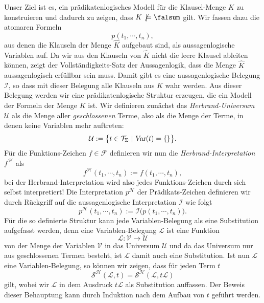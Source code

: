 Unser Ziel ist es, ein prädikatenlogisches Modell für die Klausel-Menge $K$ zu konstruieren und
dadurch zu zeigen, dass $K \not\,\models \falsum$ gilt.
Wir fassen dazu die atomaren Formeln
\[ p(t_1,\cdots,t_n), \]
aus denen die Klauseln der Menge $\widehat{K}$ aufgebaut sind, als aussagenlogische Variablen auf.
Da wir aus den Klauseln von $\widehat{K}$ nicht die leere Klausel ableiten können, zeigt der
Vollständigkeits-Satz der Aussagenlogik, dass die Menge $\widehat{K}$ aussagenlogisch erfüllbar 
sein muss.  Damit gibt es eine aussagenlogische Belegung $\mathcal{I}$, so dass mit dieser Belegung
alle Klauseln aus $K$ wahr werden.  Aus dieser Belegung werden wir eine prädikatenlogische Struktur
erzeugen, die ein Modell der Formeln der Menge $K$ ist.  Wir definieren zunächst das
\emph{Herbrand-Universum} $\mathcal{U}$ als die Menge aller \emph{geschlossenen} Terme,
also als die Menge der Terme, in denen keine Variablen mehr auftreten:
\[ \mathcal{U} := \bigl\{ t \in \mathcal{T}_\Sigma \mid \textsl{Var}(t) = \{\} \bigr\}. \]
Für die Funktions-Zeichen $f \in \mathcal{F}$ definieren wir nun die \emph{Herbrand-Interpretation}
$f^\mathcal{H}$ als
\[ f^\mathcal{H}(t_1, \cdots, t_n) := f(t_1,\cdots,t_n), \]
bei der Herbrand-Interpretation wird also jedes Funktions-Zeichen durch sich selbst interpretiert!
Die Interpretation $p^\mathcal{H}$ der Prädikats-Zeichen definieren wir durch Rückgriff auf die
aussagenlogische Interpretation $\mathcal{I}$ wie folgt
\[ 
  p^\mathcal{H}(t_1,\cdots,t_n) := \mathcal{I}\bigl(p(t_1,\cdots,t_n)\bigr).
\]
Für die so definierte Struktur kann jede Variablen-Belegung als eine Substitution
aufgefasst werden, denn eine Variablen-Belegung $\mathcal{L}$ ist eine Funktion
\[ \mathcal{L}: \mathcal{V} \rightarrow \mathcal{U} \]
von der Menge der Variablen $\mathcal{V}$ in das Universum $\mathcal{U}$ und da das
Universum nur aus geschlossenen Termen besteht, ist $\mathcal{L}$ damit auch eine
Substitution.  Ist nun $\mathcal{L}$ eine Variablen-Belegung, so können wir zeigen, dass für jeden
Term $t$ 
\[ \mathcal{S}^\mathcal{H}(\mathcal{L}, t) = \mathcal{S}^\mathcal{H}(\mathcal{L},t\mathcal{L})  \]
gilt, wobei wir $\mathcal{L}$ in dem Ausdruck $t\mathcal{L}$ als Substitution auffassen.  
Der Beweis dieser Behauptung kann durch Induktion nach dem Aufbau von $t$ geführt werden.


